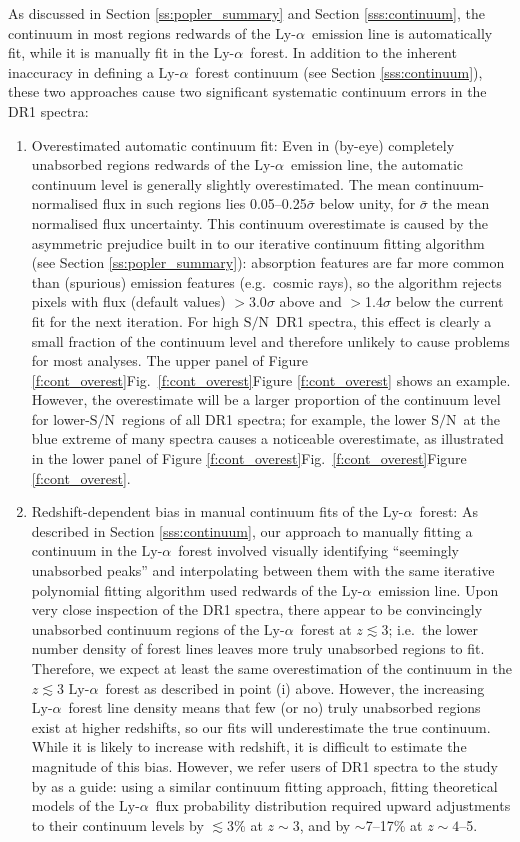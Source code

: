\documentclass[fleqn,usenatbib,usedcolumn]{mnras}
\renewcommand{\la}{\lesssim} %
\newcommand{\Sref}[1]{Section \ref{#1}}
\newcommand{\Fref}[1]{\ifhmode \ifnum\spacefactor=1001 Figure \ref{#1}\else Fig.\ \ref{#1}\fi \else Figure \ref{#1}\fi}
\newcommand{\SN}{\ensuremath{\textrm{S/N}}}
\newcommand{\lya}{\ensuremath{\textrm{Ly-}\alpha}}
\begin{document}
As discussed in \Sref{ss:popler_summary} and \Sref{sss:continuum}, the continuum in most regions redwards of the \lya\ emission line is automatically fit, while it is manually fit in the \lya\ forest. In addition to the inherent inaccuracy in defining a \lya\ forest continuum (see \Sref{sss:continuum}), these two approaches cause two significant systematic continuum errors in the DR1 spectra:
\begin{enumerate}
\item Overestimated automatic continuum fit: Even in (by-eye) completely unabsorbed regions redwards of the \lya\ emission line, the automatic continuum level is generally slightly overestimated. The mean continuum-normalised flux in such regions lies 0.05--0.25$\bar{\sigma}$ below unity, for $\bar{\sigma}$ the mean normalised flux uncertainty. This continuum overestimate is caused by the asymmetric prejudice built in to our iterative continuum fitting algorithm (see \Sref{ss:popler_summary}): absorption features are far more common than (spurious) emission features (e.g.\ cosmic rays), so the algorithm rejects pixels with flux (default values) $>$3.0$\sigma$ above and $>$1.4$\sigma$ below the current fit for the next iteration. For high \SN\ DR1 spectra, this effect is clearly a small fraction of the continuum level and therefore unlikely to cause problems for most analyses. The upper panel of \Fref{f:cont_overest} shows an example. However, the overestimate will be a larger proportion of the continuum level for lower-\SN\ regions of all DR1 spectra; for example, the lower \SN\ at the blue extreme of many spectra causes a noticeable overestimate, as illustrated in the lower panel of \Fref{f:cont_overest}.
\item Redshift-dependent bias in manual continuum fits of the \lya\ forest: As described in \Sref{sss:continuum}, our approach to manually fitting a continuum in the \lya\ forest involved visually identifying ``seemingly unabsorbed peaks'' and interpolating between them with the same iterative polynomial fitting algorithm used redwards of the \lya\ emission line. Upon very close inspection of the DR1 spectra, there appear to be convincingly unabsorbed continuum regions of the \lya\ forest at $z\la3$; i.e.\ the lower number density of forest lines leaves more truly unabsorbed regions to fit. Therefore, we expect at least the same overestimation of the continuum in the $z\la3$ \lya\ forest as described in point (i) above. However, the increasing \lya\ forest line density means that few (or no) truly unabsorbed regions exist at higher redshifts, so our fits will underestimate the true continuum. While it is likely to increase with redshift, it is difficult to estimate the magnitude of this bias. However, we refer users of DR1 spectra to the study by \citet{Becker:2007:72} as a guide: using a similar continuum fitting approach, fitting theoretical models of the \lya\ flux probability distribution required upward adjustments to their continuum levels by $\la$3\% at $z\sim3$, and by $\sim$7--17\% at $z\sim4$--5.
\end{enumerate}
\end{document}
